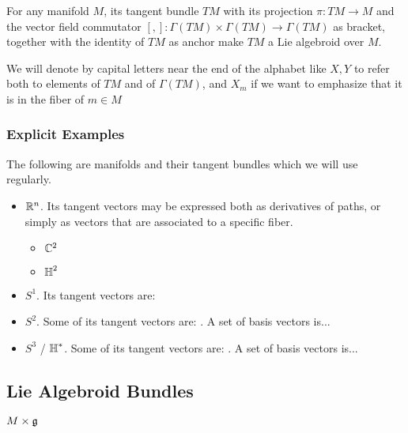 For any manifold $M$, its tangent bundle $TM$ with its projection $\pi:TM \to M$ and the vector field commutator $[,]: \Gamma(TM)\times \Gamma(TM) \to \Gamma(TM)$ as bracket, together with the identity of $TM$ as anchor make $TM$ a Lie algebroid over $M$.

We will denote by capital letters near the end of the alphabet like $X, Y$ to refer both to elements of $TM$ and of $\Gamma(TM)$, and $X_m$ if we want to emphasize that it is in the fiber of $m \in M$

\subsubsection{Explicit Examples}

The following are manifolds and their tangent bundles which we will use regularly.

    \begin{itemize}
    \item $\mathbb{R}^n$. Its tangent vectors may be expressed both as derivatives of paths, or simply as vectors that are associated to a specific fiber.
        \begin{itemize}
        \item $\mathbb{C}^2$
        \item $\operatorname{\mathbb{H}}^2$
        \end{itemize}
    \item $S^1$. Its tangent vectors are:
    \item $S^2$. Some of its tangent vectors are: . A set of basis vectors is...
    \item $S^3$ / $\operatorname{\mathbb{H}}^*$. Some of its tangent vectors are: . A set of basis vectors is...
    \end{itemize}

\subsection{Lie Algebroid Bundles}

\begin{definition}
$M \times \mathfrak{g}$
\end{definition}

